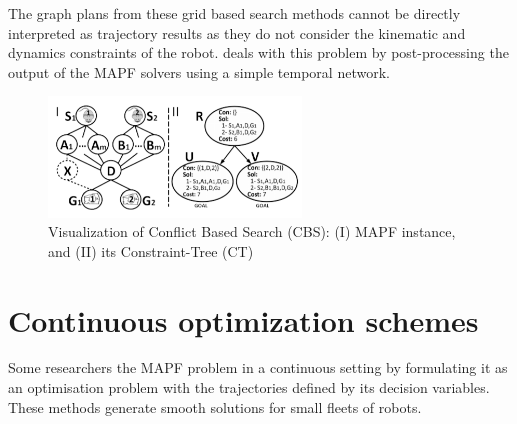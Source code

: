 The graph plans from these grid based search methods cannot be directly interpreted as trajectory results as they do not consider the kinematic and dynamics constraints of the robot. \cite{honig2016multi} deals with this problem by post-processing the output of the MAPF solvers using a simple temporal network. 

\begin{figure}
\centering
\includegraphics[width=0.6\textwidth]{./images/CBS}
\caption[Visualization of Conflict Based Search]{Visualization of Conflict Based Search (CBS): (I) MAPF instance, and (II) its Constraint-Tree (CT)}
\label{fig:cbs}
\end{figure}

\section{Continuous optimization schemes}
Some researchers the MAPF problem in a continuous setting by formulating it as an optimisation problem with the trajectories defined by its decision variables. These methods generate smooth solutions for small fleets of robots. 

